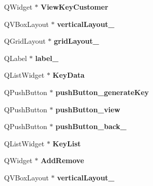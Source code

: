 \begin{DoxyCompactItemize}
\hypertarget{class_ui___main_window_ac4ff6e072620f9d21f155f31a5ddc71d}{}\label{class_ui___main_window_ac4ff6e072620f9d21f155f31a5ddc71d} 
Q\+Widget $\ast$ {\bfseries View\+Key\+Customer}
\item 
\hypertarget{class_ui___main_window_a7b66d5d6ab55f3977317359d09a42345}{}\label{class_ui___main_window_a7b66d5d6ab55f3977317359d09a42345} 
Q\+V\+Box\+Layout $\ast$ {\bfseries vertical\+Layout\+\_}
\item 
\hypertarget{class_ui___main_window_a8731b71c513ff94baf59614807823c5d}{}\label{class_ui___main_window_a8731b71c513ff94baf59614807823c5d} 
Q\+Grid\+Layout $\ast$ {\bfseries grid\+Layout\+\_}
\item 
\hypertarget{class_ui___main_window_a663f728e6244926a795c6e6892673b1d}{}\label{class_ui___main_window_a663f728e6244926a795c6e6892673b1d} 
Q\+Label $\ast$ {\bfseries label\+\_}
\item 
\hypertarget{class_ui___main_window_a511cd3433fc97557a14a2bd5a0b4338c}{}\label{class_ui___main_window_a511cd3433fc97557a14a2bd5a0b4338c} 
Q\+List\+Widget $\ast$ {\bfseries Key\+Data}
\item 
\hypertarget{class_ui___main_window_a6b18450f6d4250cd35c0441dbd282a0d}{}\label{class_ui___main_window_a6b18450f6d4250cd35c0441dbd282a0d} 
Q\+Push\+Button $\ast$ {\bfseries push\+Button\+\_\+generate\+Key}
\item 
\hypertarget{class_ui___main_window_adf6745d8c1b8a0456800a7ca37924d61}{}\label{class_ui___main_window_adf6745d8c1b8a0456800a7ca37924d61} 
Q\+Push\+Button $\ast$ {\bfseries push\+Button\+\_\+view}
\item 
\hypertarget{class_ui___main_window_aa33928f3eb5593601b817641a83909ab}{}\label{class_ui___main_window_aa33928f3eb5593601b817641a83909ab} 
Q\+Push\+Button $\ast$ {\bfseries push\+Button\+\_\+back\+\_}
\item 
\hypertarget{class_ui___main_window_a9f2375499484e7ca4723d6532f28499a}{}\label{class_ui___main_window_a9f2375499484e7ca4723d6532f28499a} 
Q\+List\+Widget $\ast$ {\bfseries Key\+List}
\item 
\hypertarget{class_ui___main_window_a609b04cadea67e89d037fd377074cf3d}{}\label{class_ui___main_window_a609b04cadea67e89d037fd377074cf3d} 
Q\+Widget $\ast$ {\bfseries Add\+Remove}
\item 
\hypertarget{class_ui___main_window_a93c190b085c63a667c535ba0bbcfec7c}{}\label{class_ui___main_window_a93c190b085c63a667c535ba0bbcfec7c} 
Q\+V\+Box\+Layout $\ast$ {\bfseries vertical\+Layout\+\_}
\item 

\end{DoxyCompactItemize}
